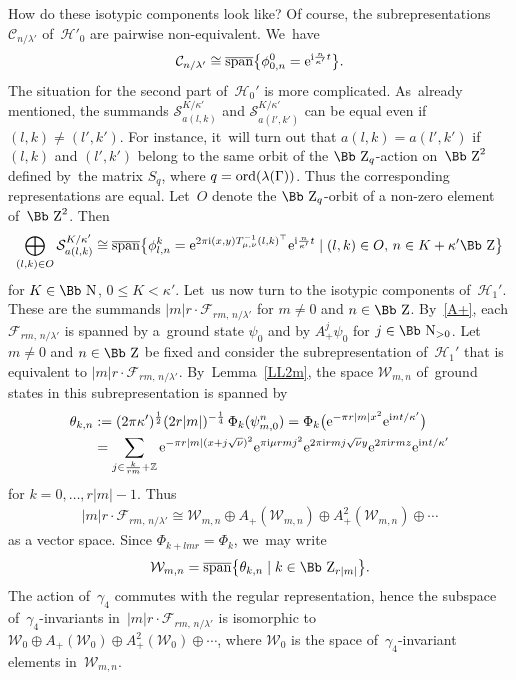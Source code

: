 \documentclass[10pt,a4paper]{amsart}
\newcommand\NN{{\mbox{\Bb N}}}
\newcommand\ZZ{{\mbox{\Bb Z}}}
\newcommand\Z{{\mathbb Z}}
\newcommand\cC{{\mathcal C}}
\newcommand\cW{{\mathcal W}}
\newcommand\cH{{\mathcal H}}
\newcommand\cF{{\mathcal F}}
\newcommand{\cSpan}{{\overline{\rm span}}}
\newcommand{\ord}{{\rm ord}}
\numberwithin{equation}{section}
\begin{document}
How do these isotypic components look like? Of course, the subrepresentations $\cC_{n/\lambda'}$ of~$\cH'_0$ are pairwise non-equivalent. We~have
\begin{gather*}
\cC_{n/\lambda'}\cong\cSpan\big\{ \phi^0_{0,n}= {\rm e}^{{\rm i} \frac n{\kappa'} t}\big\}.
\end{gather*}
The situation for the second part of~$\cH_0'$ is more complicated. As~already mentioned, the summands ${\mathcal S}_{a(l,k)}^{K/\kappa'}$ and ${\mathcal S}_{a( l',k')}^{K/\kappa'}$ can be equal even if $(l,k)\not=(l',k')$. For instance, it~will turn out that $a(l,k)=a(l',k')$ if $(l,k)$ and $(l',k')$ belong to the same orbit of the $\ZZ_q$-action on~$\ZZ^2$ defined by~the matrix $S_q$, where $q=\ord(\lambda(\Gamma))$. Thus the corresponding representations are equal. Let~$O$ denote the $\ZZ_q$-orbit of a non-zero element of~$\ZZ^2$. Then
%
\begin{gather*}
\bigoplus _{(l,k)\in O} {\mathcal S}_{a(l,k)}^{K/\kappa'}\cong
\cSpan\big\{ \phi_{l,n}^k={\rm e}^{2\pi {\rm i}(x,y)T_{\mu,\nu}^{-1}(l,k)^\top} {\rm e}^{{\rm i} \frac n{\kappa'} t}\mid (l,k)\in O,\, n\in K+\kappa'\ZZ\big\}
\end{gather*}
for $K\in \NN$, $0\le K<\kappa'$. Let~us now turn to the isotypic components of~$\cH_1'$. These are the summands $|m|r\cdot \cF_{rm,\,n/\lambda'}$ for $m\not=0$ and $n\in\ZZ$. By~\eqref{A+}, each $\cF_{rm,\,n/\lambda'}$ is spanned by a~ground state $\psi_0$ and by $A_+^j\psi_0$ for $j\in\NN_{>0}$. Let~$m\not=0$ and $n\in\ZZ$ be fixed and consider the subrepresentation of~$\cH_1'$ that is equivalent to $|m|r\cdot \cF_{rm,\,n/\lambda'}$. By~Lemma~\ref{LL2m}, the space ${\mathcal W}_{m,n}$ of~ground states in this subrepresentation is spanned by
\begin{align*}
\theta_{k,n}&:=(2\pi\kappa')^{\frac12}(2r|m|)^{-\frac14}\,\Phi_k(\psi^n_{m,0})
=\Phi_k\big({\rm e}^{-\pi r |m|x^2}{\rm e}^{{\rm i}nt/\kappa'}\big)
\\
&= \sum_{j\in \frac k{rm}+\Z}
{\rm e}^{-\pi r |m|(x+j\sqrt\nu)^2}{\rm e}^{\pi {\rm i}\mu rmj^2}{\rm e}^{2\pi {\rm i}rmj\sqrt\nu y}{\rm e}^{2\pi {\rm i}rmz}{\rm e}^{{\rm i}nt/\kappa'}
\end{align*}
for $k=0,\dots,r|m|-1$. Thus
\begin{gather*}
|m|r\cdot \cF_{rm,\,n/\lambda'}\cong {\mathcal W}_{m,n}\oplus A_+({\mathcal W}_{m,n})\oplus A_+^2({\mathcal W}_{m,n})\oplus\cdots
\end{gather*}
as a vector space.
Since $\Phi_{k+lmr}=\Phi_k$, we~may write
\begin{gather*}
{\mathcal W}_{m,n}=\cSpan\big\{\theta_{k,n}\mid k\in \ZZ_{r|m|}\big\}.
\end{gather*}
The action of~$\gamma_4$ commutes with the regular representation, hence the subspace of~$\gamma_4$-invariants in~$|m|r\cdot \cF_{rm,\,n/\lambda'}$ is isomorphic to
${\cW_0}\oplus A_+({\cW_0})\oplus A_+^2({\mathcal W}_0)\oplus\cdots$, where $\cW_0$ is the space of~$\gamma_4$-invariant elements in~$\cW_{m,n}$.
\end{document}
